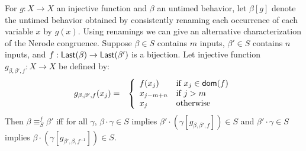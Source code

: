 For $g : X \to X$ an injective function and $\beta$ an untimed behavior, let $\beta [g]$ denote the untimed behavior obtained
by consistently renaming each occurrence of each variable $x$ by $g(x)$. Using renamings we can give an alternative characterization
of the Nerode congruence.
Suppose $\beta \in S$ contains $m$ inputs, $\beta' \in S$ contains $n$ inputs,
and $f : \mathsf{Last}({\beta})  \to \mathsf{Last}({\beta'})$ is a bijection. 
Let injective function $g_{\beta, \beta', f}: X \to X$ be defined by:
\begin{eqnarray*}
g_{\beta, \beta', f} (x_j) & = & \left\{ 
\begin{array}{ll}
f(x_j) & \mbox{if } x_j \in {\textsf{dom}}(f)\\
x_{j-m+n} & \mbox{if } j > m \\
x_j    & \mbox{otherwise }
\end{array}
\right.
\end{eqnarray*}
Then $\beta \equiv^f_S \beta'$ iff for all $\gamma$,
$\beta \cdot \gamma \in S$ implies $\beta' \cdot (\gamma[g_{\beta, \beta', f}]) \in S$ and
$\beta' \cdot \gamma \in S$ implies $\beta \cdot (\gamma[g_{\beta', \beta, f^{-1}}]) \in S$.

